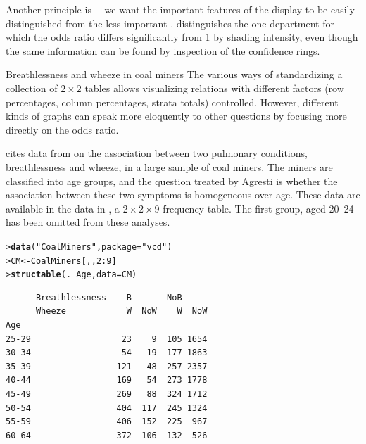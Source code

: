 \documentclass[10pt,krantz2]{krantz}\usepackage[]{graphicx}\usepackage[]{color}
\makeatletter
\newcommand{\hlnum}[1]{\textcolor[rgb]{0.686,0.059,0.569}{#1}}%
\newcommand{\hlstr}[1]{\textcolor[rgb]{0.192,0.494,0.8}{#1}}%
\newcommand{\hlopt}[1]{\textcolor[rgb]{0,0,0}{#1}}%
\newcommand{\hlstd}[1]{\textcolor[rgb]{0.345,0.345,0.345}{#1}}%
\newcommand{\hlkwb}[1]{\textcolor[rgb]{0.69,0.353,0.396}{#1}}%
\newcommand{\hlkwc}[1]{\textcolor[rgb]{0.333,0.667,0.333}{#1}}%
\newcommand{\hlkwd}[1]{\textcolor[rgb]{0.737,0.353,0.396}{\textbf{#1}}}%
\newenvironment{kframe}{%
 \def\at@end@of@kframe{}%
 \ifinner\ifhmode%
  \def\at@end@of@kframe{\end{minipage}}%
  \begin{minipage}{\columnwidth}%
 \fi\fi%
 \def\FrameCommand##1{\hskip\@totalleftmargin \hskip-\fboxsep
 \colorbox{shadecolor}{##1}\hskip-\fboxsep
     \hskip-\linewidth \hskip-\@totalleftmargin \hskip\columnwidth}%
 \MakeFramed {\advance\hsize-\width
   \@totalleftmargin\z@ \linewidth\hsize
   \@setminipage}}%
 {\par\unskip\endMakeFramed%
 \at@end@of@kframe}
\newenvironment{knitrout}{}{} %
\renewenvironment{knitrout}{\small\renewcommand{\baselinestretch}{.85}}{} %
\makeatother
\begin{document}
Another principle is ---we want the important
features
of the display to be easily distinguished from the less important
\citep{Tukey:93}.
 distinguishes the one department for which
the odds ratio differs significantly from 1 by shading intensity,
even though the same information can be found by inspection of the
confidence rings.

\begin{Example}[wheeze1]{Breathlessness and wheeze in coal miners}
The various ways of standardizing a collection of $2 \times 2$ tables
allows visualizing relations with different factors
(row percentages, column percentages, strata totals) controlled.
However, different kinds of graphs can speak more eloquently to other questions by focusing more directly on the odds ratio.

\citet[Table 9.8]{Agresti:2002} cites data from
\citet{AshfordSowden:70} on the association between
two pulmonary conditions, breathlessness and wheeze, in a large sample of coal miners.
The miners are classified into age groups, and the question treated
by Agresti is whether the association between these two symptoms
is homogeneous over age.%
These data are available in the  data in
, a $2 \times 2 \times 9$ frequency table.
The first group, aged 20--24 has been omitted from these
analyses.
\begin{knitrout}
\color{fgcolor}\begin{kframe}
\begin{alltt}
\hlstd{> }\hlkwd{data}\hlstd{(}\hlstr{"CoalMiners"}\hlstd{,} \hlkwc{package} \hlstd{=} \hlstr{"vcd"}\hlstd{)}
\hlstd{> }\hlstd{CM} \hlkwb{<-} \hlstd{CoalMiners[, ,} \hlnum{2} \hlopt{:} \hlnum{9}\hlstd{]}
\hlstd{> }\hlkwd{structable}\hlstd{(.} \hlopt{~} \hlstd{Age,} \hlkwc{data} \hlstd{= CM)}
\end{alltt}
\begin{verbatim}
      Breathlessness    B       NoB     
      Wheeze            W  NoW    W  NoW
Age                                     
25-29                  23    9  105 1654
30-34                  54   19  177 1863
35-39                 121   48  257 2357
40-44                 169   54  273 1778
45-49                 269   88  324 1712
50-54                 404  117  245 1324
55-59                 406  152  225  967
60-64                 372  106  132  526
\end{verbatim}
\end{kframe}
\end{knitrout}


\end{Example}
\end{document}
